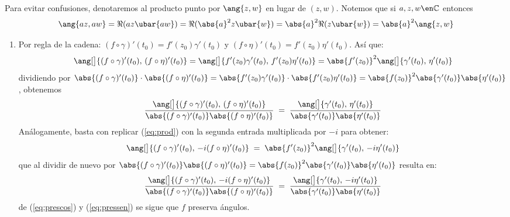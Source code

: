 \begin{sol}
Para evitar confusiones, denotaremos al producto punto por $\ang{z,w}$ en lugar de $(z,w)$. Notemos que si $a,z,w\en\mathbb{C}$ entonces 
\[
\ang{az,aw} = \Re(az\ubar{aw}) = \Re(\abs{a}^2z\ubar{w}) = \abs{a}^2\Re(z\ubar{w}) = \abs{a}^2\ang{z,w}
\]
\begin{enumerate}[label=(\alph*),leftmargin=1.5em]
\item 
Por regla de la cadena: $(f\circ\gamma)'(t_0) = f'(z_0)\gamma'(t_0)$ y $(f\circ\eta)'(t_0) = f'(z_0)\eta'(t_0)$. Así que:
\begin{equation}\label{eq:prod}
\ang[\big]{(f\circ \gamma)'(t_0),\,(f\circ\eta)'(t_0)}
=\ang[\big]{f'(z_0)\gamma'(t_0),\, f'(z_0)\eta'(t_0)}
=\abs{f'(z_0)}^2\ang[\big]{\gamma'(t_0),\, \eta'(t_0)}
\end{equation}
dividiendo por $\abs{(f\circ\gamma)'(t_0)}\cdot\abs{(f\circ\eta)'(t_0)} = \abs{f'(z_0)\gamma'(t_0)}\cdot\abs{f'(z_0)\eta'(t_0)} = \abs{f(z_0)}^2\abs{\gamma'(t_0)}\abs{\eta'(t_0)}$, obtenemos
\begin{equation}\label{eq:prescos}
\frac{ \ang[\big]{(f\circ \gamma)'(t_0),\,(f\circ\eta)'(t_0)} }{ \abs{(f\circ\gamma)'(t_0)}\abs{(f\circ\eta)'(t_0)} }
\;=\; \frac{ \ang[\big]{\gamma'(t_0),\, \eta'(t_0)} }{ \abs{\gamma'(t_0)}\abs{\eta'(t_0)} }
\end{equation}
Análogamente, basta con replicar (\ref{eq:prod}) con la segunda entrada multiplicada por $-i$ para obtener:
\[
\ang[\big]{(f\circ \gamma)'(t_0),\,-i(f\circ\eta)'(t_0)}
\;=\; \abs{f'(z_0)}^2\ang[\big]{\gamma'(t_0),\, -i\eta'(t_0)}
\]
que al dividir de nuevo por $\abs{(f\circ\gamma)'(t_0)}\abs{(f\circ\eta)'(t_0)} = \abs{f(z_0)}^2\abs{\gamma'(t_0)}\abs{\eta'(t_0)}$ resulta en:
\begin{equation}\label{eq:pressen}
\frac{ \ang[\big]{(f\circ \gamma)'(t_0),\,-i(f\circ\eta)'(t_0)} }{ \abs{(f\circ\gamma)'(t_0)}\abs{(f\circ\eta)'(t_0)} }
\;=\; \frac{ \ang[\big]{\gamma'(t_0),\, -i\eta'(t_0)} }{ \abs{\gamma'(t_0)}\abs{\eta'(t_0)} }
\end{equation}
de (\ref{eq:prescos}) y (\ref{eq:pressen}) se sigue que $f$ preserva ángulos.


\end{enumerate}
\end{sol}
